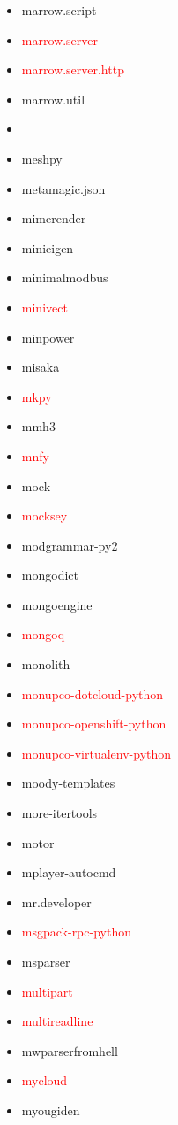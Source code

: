 \documentclass{l4proj}
\begin{document}
\begin{appendices}
{\begin{itemize}
\item marrow.script
\item\textcolor{red}{marrow.server}
\item\textcolor{red}{marrow.server.http}
\item marrow.util
\item {}
\item meshpy
\item metamagic.json
\item mimerender
\item minieigen
\item minimalmodbus
\item\textcolor{red}{minivect}
\item minpower
\item misaka
\item\textcolor{red}{mkpy}
\item mmh3
\item\textcolor{red}{mnfy}
\item mock
\item\textcolor{red}{mocksey}
\item modgrammar-py2
\item mongodict
\item mongoengine
\item\textcolor{red}{mongoq}
\item monolith
\item\textcolor{red}{monupco-dotcloud-python}
\item\textcolor{red}{monupco-openshift-python}
\end{itemize}
}%
\noindent\parbox[t]{0.32\textwidth}{\raggedright%
\begin{itemize}
\item\textcolor{red}{monupco-virtualenv-python}
\item moody-templates
\item more-itertools
\item motor
\item mplayer-autocmd
\item mr.developer
\item\textcolor{red}{msgpack-rpc-python}
\item msparser
\item\textcolor{red}{multipart}
\item\textcolor{red}{multireadline}
\item mwparserfromhell
\item\textcolor{red}{mycloud}
\item myougiden

\end{itemize}}
\end{appendices}
\end{document}
